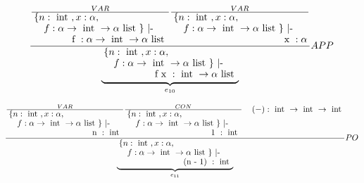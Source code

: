 \begin{equation}
	\frac
	{
		\frac
		{
			VAR
		}
		{
	        			\splitfrac
				{
        					\splitfrac
					{
						\{ n: \tauthree, x: \tautwo,
	                         		}
        		        	        		{
 						f: \tauone \} \text{ |- }                         		
 					}
 	                        }
        		               {
                         		        \text{ f }: \tauone
                         	      }
	      }
	      \frac
	      {
	      	      VAR
	      }
	      {
	        			\splitfrac
				{
        					\splitfrac
					{
						\{ n: \tauthree, x: \tautwo,
	                         		}
        		        	        		{
 						f: \tauone \} \text{ |- }                         		
 					}
 	                        }
        		               {
                         		        \text{ x }: \tautwo
                         	      }
	      }
	} 
        {
        	      \underbrace{
	        			\splitfrac
				{
        					\splitfrac
					{
						\{ n: \tauthree, x: \tautwo,
	                         		}
        		        	        		{
 						f: \tauone \} \text{ |- }                         		
 					}
 	                        }
        		               {
                         		        \text{ f x }: \tauthree \rightarrow \taufour
                         	      }
               }_{e_{10}}
	}
        {
            APP
        }
\end{equation}

\begin{equation}
	\frac
	{
		\frac
		{
			VAR
		}
		{
	        			\splitfrac
				{
        					\splitfrac
					{
						\{ n: \tauthree, x: \tautwo,
	                         		}
        		        	        		{
 						f: \tauone \} \text{ |- }                         		
 					}
 	                        }
        		               {
                         		        \text{ n }: \tauthree
                         	      }
	      }
	      \frac
	      {
	      		CON
	      }
	      {
	        			\splitfrac
				{
        					\splitfrac
					{
						\{ n: \tauthree, x: \tautwo,
	                         		}
        		        	        		{
 						f: \tauone \} \text{ |- }                         		
 					}
 	                        }
        		               {
                         		        \text{ 1 }: \tauthree
                         	      }
	      }
	      \hspace{4mm} (-): \tauthree \rightarrow \tauthree \rightarrow \tauthree
	} 
        {
	        	      \underbrace{
	        			\splitfrac
				{
        					\splitfrac
					{
						\{ n: \tauthree, x: \tautwo,
	                         		}
        		        	        		{
 						f: \tauone \} \text{ |- }                         		
 					}
 	                        }
        		               {
                         		        \text{ (n - 1) }: \tauthree
                         	      }
                     }_{e_{11}}
	}
        {
            PO
        }
\end{equation}
	
